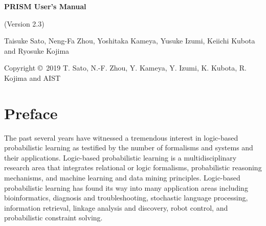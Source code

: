 \documentclass[a4paper]{report}
\begin{document}
\begin{center}
\par\vspace*{3cm}\par
{\Huge\bf PRISM User's Manual}\par\vspace*{0.5cm}\par
{\Large (Version 2.3)}\par\vspace*{12cm}\par

{\normalsize Taisuke Sato, Neng-Fa Zhou, Yoshitaka Kameya, Yusuke Izumi, Keiichi Kubota and Ryosuke Kojima}


\par\vspace*{2cm}\par

{\footnotesize Copyright \copyright~2019 T. Sato, N.-F. Zhou, Y. Kameya, Y. Izumi, K. Kubota, R. Kojima and AIST}
\end{center}
\thispagestyle{empty}
\setcounter{page}{0}%
\clearpage


\section*{Preface}

The past several years have witnessed a tremendous interest in logic-based
probabilistic learning as testified by the number of formalisms and systems
and their applications. Logic-based probabilistic learning is a multidisciplinary
research area that integrates relational or logic formalisms, probabilistic
reasoning mechanisms, and machine learning and data mining principles.
Logic-based probabilistic learning has found its way into many application
areas including bioinformatics, diagnosis and troubleshooting, stochastic
language processing, information retrieval, linkage analysis and discovery,
robot control, and probabilistic constraint solving.
\end{document}
